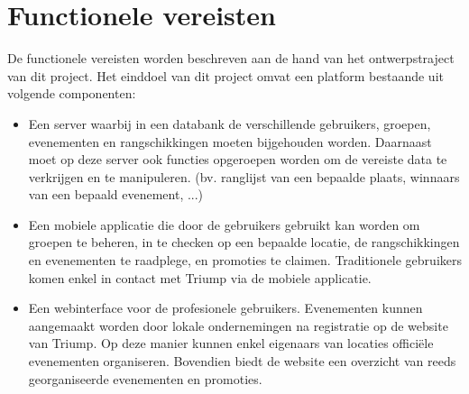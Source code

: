 \section{Functionele vereisten}
De functionele vereisten worden beschreven aan de hand van het ontwerpstraject van dit project.
Het einddoel van dit project omvat een platform bestaande uit volgende componenten: 
\begin{itemize}
	
	\item Een server waarbij in een databank de verschillende gebruikers, groepen, evenementen en rangschikkingen moeten bijgehouden worden. Daarnaast moet op deze server ook functies opgeroepen worden om de vereiste data te verkrijgen en te manipuleren. (bv. ranglijst van een bepaalde plaats, winnaars van een bepaald evenement, ...)
	\item Een mobiele applicatie die door de gebruikers gebruikt kan worden om groepen te beheren, in te checken op een bepaalde locatie, de rangschikkingen en evenementen te raadplege, en promoties te claimen. 
	Traditionele gebruikers komen enkel in contact met Triump via de mobiele applicatie. 
	\item Een webinterface voor de profesionele gebruikers. Evenementen kunnen aangemaakt worden door lokale ondernemingen na registratie op de website van Triump. Op deze manier kunnen enkel eigenaars van locaties officiële evenementen organiseren. Bovendien biedt de website een overzicht van reeds georganiseerde evenementen en promoties.
	
\end{itemize}
